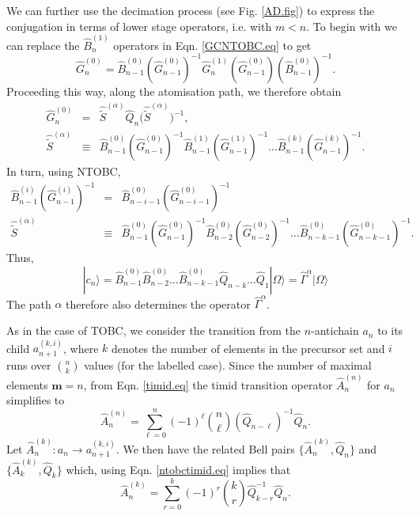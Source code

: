 \documentclass[11pt]{article}
\newcommand{\hA}{\hat { A}}
\newcommand{\ket}[1]{| #1 \rangle}
\newcommand{\hG}{\hat G}
\newcommand{\hQ}{\hat Q}
\newcommand{\hB}{\hat B}
\newcommand{\achain}{a}
\newcommand{\bmm}{{\mathbf m}}
\newcommand{\h}{\hat}
\newcommand{\tS}{\tilde S}
\begin{document}
We can further use the decimation process (see Fig. \ref{AD.fig}) to express the conjugation
in terms of lower stage operators, i.e.  with $m<n$.  To begin with we
can replace the $\h B_n^{(1)}$ operators in Eqn. \eqref{GCNTOBC.eq} to
get 
\begin{equation}
  \hG_n^{(0)}=\hB_{n-1}^{(0)}  (\hG_{n-1}^{(0)})^{-1}\hG_{n}^{(1)}
  (\hG_{n-1}^{(0)}) (\hB_{n-1}^{(0)})^{-1}. 
\end{equation} 
Proceeding this way, along the atomisation path, we therefore obtain 
\begin{eqnarray} 
  \hG_n^{(0)} &= &  \h \tS^{(\alpha)} \hQ_{n} \bigl(\h \tS^{(\alpha)}\bigr)^{-1},
  \nonumber \\
\h\tS^{(\alpha)} &\equiv& 
 \hB_{n-1}^{(0)}  (\hG_{n-1}^{(0)})^{-1}\hB_{n-1}^{(1)} (\hG_{n-1}^{(1)})^{-1} \ldots \hB_{n-1}^{(k)} (\hG_{n-1}^{(k)})^{-1}. \label{decimation.eq}
\end{eqnarray} 
In turn, using NTOBC, 
\begin{eqnarray} 
  \hB_{n-1}^{(i)}  (\hG_{n-1}^{(i)})^{-1} &=&   \hB_{n-i-1}^{(0)}
                                              (\hG_{n-i-1}^{(0)})^{-1} \nonumber \\
 \h \tS^{(\alpha)} &\equiv& 
 \hB_{n-1}^{(0)}  (\hG_{n-1}^{(0)})^{-1}\hB_{n-2}^{(0)} (\hG_{n-2}^{(0)})^{-1} \ldots \hB_{n-k-1}^{(0)} (\hG_{n-k-1}^{(0)})^{-1}. 
\end{eqnarray} 
Thus,
\begin{equation}
\ket{c_n} = \hB_{n-1}^{(0)} \hB_{n-2}^{(0)} \ldots \hB_{n-k-1}^{(0)}
\hQ_{n-k} \ldots \hQ_1 \ket{\Omega} =\h \Gamma^{\alpha}   \ket{\Omega}
  \end{equation} 
The path $\alpha$ therefore also determines the operator  $\h\Gamma^{\alpha}$. 


  
As in the case of TOBC, we consider the transition from the
$n$-antichain $\achain_n$ to its child  $\achain_{n+1}^{(k,i)}$, where $k$
denotes the number of elements in the precursor set and $i$  runs over
$\binom{n}{k}$ values (for the labelled case). Since the number of maximal elements $\bmm=n$,
from Eqn. \eqref{timid.eq}  the timid transition operator
$\hA_n^{(n)}$ for $\achain_n$ simplifies to
\begin{equation}
\hA_n^{(n)}=\sum_{\ell=0}^n (-1)^\ell \binom{n}{\ell} (\hQ_{n-\ell})^{-1}
\hQ_n. \label{ntobctimid.eq} 
\end{equation} 
Let   $\hA_n^{(k)}:\achain_n \rightarrow
\achain_{n+1}^{(k,i)}$. We then have the related Bell pairs
$\{\hA_n^{(k)}, \hQ_n \}$ and  $\{\hA_{k}^{(k)}, \hQ_{k} \}$
which, using Eqn. \eqref{ntobctimid.eq} implies that
\begin{equation}
\hA_n^{(k)}=\sum_{r=0}^{k}(-1)^r \binom{k}{r} \hQ_{k-r}^{-1}
\hQ_n.  \label{ntobcnontimid.eq} 
\end{equation} 
\end{document}
